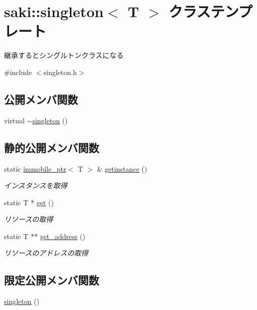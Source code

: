 \hypertarget{classsaki_1_1singleton}{}\section{saki\+:\+:singleton$<$ T $>$ クラステンプレート}
\label{classsaki_1_1singleton}


継承するとシングルトンクラスになる  




{\ttfamily \#include $<$singleton.\+h$>$}

\subsection*{公開メンバ関数}
\begin{DoxyCompactItemize}
\item 
virtual \mbox{\hyperlink{classsaki_1_1singleton_a7e18a317dec7a4658f6d3376f2dd3ebd}{$\sim$singleton}} ()
\end{DoxyCompactItemize}
\subsection*{静的公開メンバ関数}
\begin{DoxyCompactItemize}
\item 
static \mbox{\hyperlink{classsaki_1_1immobile__ptr}{immobile\+\_\+ptr}}$<$ T $>$ \& \mbox{\hyperlink{classsaki_1_1singleton_a58d7ffc1bb4b14c2878b1f21497fa655}{getinstance}} ()
\begin{DoxyCompactList}\small\item\em インスタンスを取得 \end{DoxyCompactList}\item 
static T $\ast$ \mbox{\hyperlink{classsaki_1_1singleton_a0d327725cba734d691da390a516ed29b}{get}} ()
\begin{DoxyCompactList}\small\item\em リソースの取得 \end{DoxyCompactList}\item 
static T $\ast$$\ast$ \mbox{\hyperlink{classsaki_1_1singleton_ab7d7702a8dc2d60917f7098fee763865}{get\+\_\+address}} ()
\begin{DoxyCompactList}\small\item\em リソースのアドレスの取得 \end{DoxyCompactList}\end{DoxyCompactItemize}
\subsection*{限定公開メンバ関数}
\begin{DoxyCompactItemize}
\item 
\mbox{\hyperlink{classsaki_1_1singleton_a511f5d5e51fdac173fa0dbea858f5ee0}{singleton}} ()
\end{DoxyCompactItemize}



